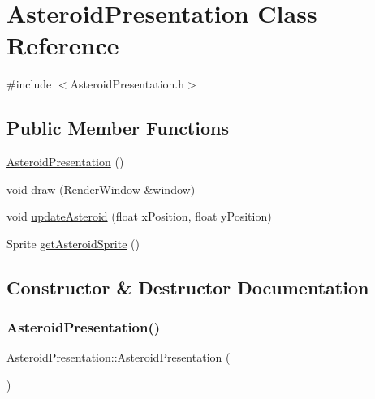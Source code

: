 \hypertarget{class_asteroid_presentation}{}\section{Asteroid\+Presentation Class Reference}
\label{class_asteroid_presentation}


{\ttfamily \#include $<$Asteroid\+Presentation.\+h$>$}

\subsection*{Public Member Functions}
\begin{DoxyCompactItemize}
\item 
\hyperlink{class_asteroid_presentation_a9b8f4fc73746ec3eaa3034b7af75caa6}{Asteroid\+Presentation} ()
\item 
void \hyperlink{class_asteroid_presentation_ac35adcd9ce3dabdb0c34b8cbf14cce9c}{draw} (Render\+Window \&window)
\item 
void \hyperlink{class_asteroid_presentation_a9af9a0a566030782f33f424c633227cc}{update\+Asteroid} (float x\+Position, float y\+Position)
\item 
Sprite \hyperlink{class_asteroid_presentation_ab1722869d573e4c6d3031033c6f74062}{get\+Asteroid\+Sprite} ()
\end{DoxyCompactItemize}


\subsection{Constructor \& Destructor Documentation}
\mbox{\label{class_asteroid_presentation_a9b8f4fc73746ec3eaa3034b7af75caa6}} 
\subsubsection{\texorpdfstring{Asteroid\+Presentation()}{AsteroidPresentation()}}
{\footnotesize\ttfamily Asteroid\+Presentation\+::\+Asteroid\+Presentation (\begin{DoxyParamCaption}{ }\end{DoxyParamCaption})}



